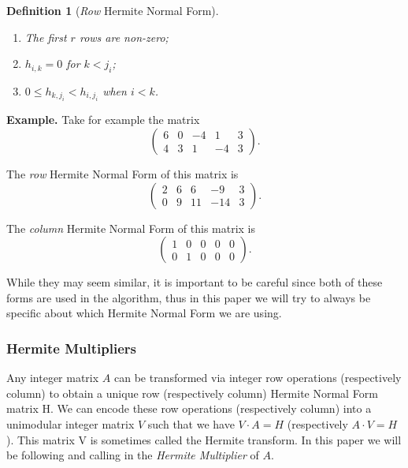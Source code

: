 \documentclass[oneside, a4paper, onecolumn, 11pt]{article}
\newtheorem{definition}{Definition}
\newenvironment{example}[1][Example]{\textbf{#1.} }{\medskip}
\begin{document}
\begin{definition}[\textit{Row} Hermite Normal Form]
    \begin{enumerate}[label=(\roman*)]
        \item The first \(r\) rows are non-zero;
        \item \(h_{i, k} = 0\) for \(k < j_i\);
        \item \(0 \le h_{k, j_i} < h_{i, j_i}\) when \(i < k\).
    \end{enumerate}
\end{definition}


\begin{example}
    Take for example the matrix
    \[
        \begin{pmatrix}
            6 & 0 & -4 & 1  & 3 \\
            4 & 3 & 1  & -4 & 3
        \end{pmatrix}.
    \]

    The \textit{row} Hermite Normal Form of this matrix is
    \[
        \begin{pmatrix}
            2 & 6 & 6  & -9  & 3 \\
            0 & 9 & 11 & -14 & 3
        \end{pmatrix}.
    \]

    The \textit{column} Hermite Normal Form of this matrix is
    \[
        \begin{pmatrix}
            1 & 0 & 0 & 0 & 0 \\
            0 & 1 & 0 & 0 & 0
        \end{pmatrix}.
    \]
\end{example}

While they may seem similar, it is important to be careful since both of these forms are used in the algorithm, thus in this paper we will try to always be specific about which Hermite Normal Form we are using.

\subsubsection{Hermite Multipliers}

Any integer matrix \(A\) can be transformed via integer row operations (respectively column) to obtain a unique row (respectively column) Hermite Normal Form matrix H. We can encode these row operations (respectively column) into a unimodular integer matrix \(V\) such that we have \(V \cdot A = H\) (respectively \(A \cdot V = H\)). This matrix V is sometimes called the Hermite transform. In this paper we will be following \cite{Hubert2013} and calling in the \textit{Hermite Multiplier} of \(A\).
\end{document}
